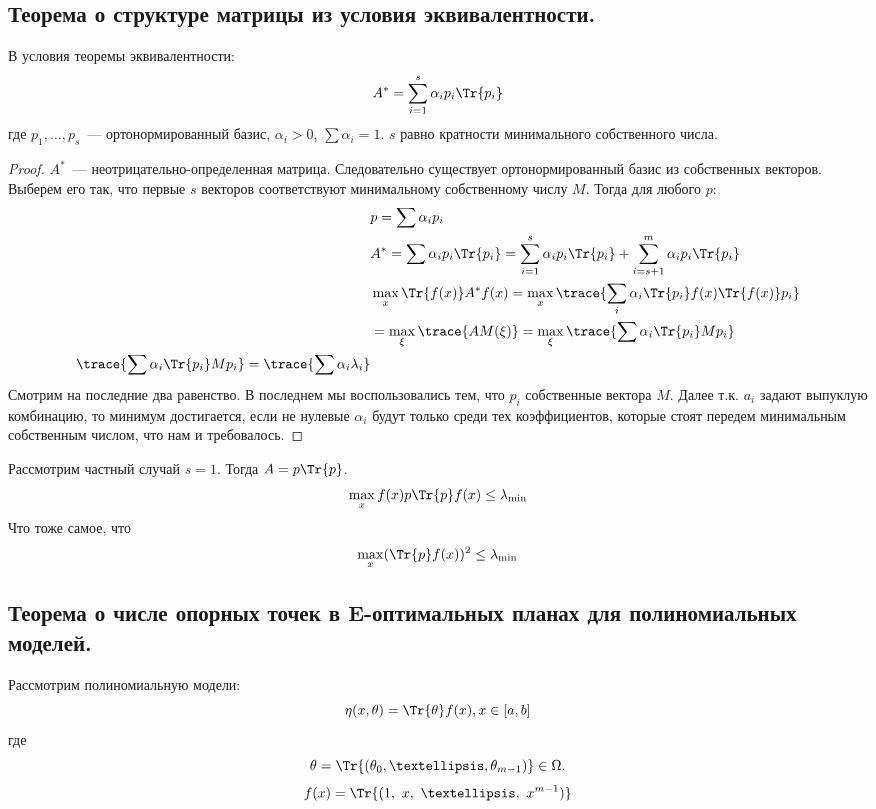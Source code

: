 \subsection{Теорема о структуре матрицы из условия эквивалентности.}
\begin{thm}
В условия теоремы эквивалентности:
$$ A^{*} = \sum \limits_{i=1}^s \alpha_i p_i \Tr{p_i}$$
где $p_1, …, p_s$ —  ортонормированный базис, $\alpha_i >0$, $\sum\alpha_i = 1$. 
$s$ равно кратности минимального собственного числа.
\end{thm}
\begin{proof}
$A^*$ — неотрицательно-определенная матрица. Следовательно существует ортонормированный базис из собственных векторов. Выберем его так, что первые $s$ векторов соответствуют минимальному собственному числу $M$. Тогда для любого $p$:
\begin{equation}
\begin{split}
&p = \sum \alpha_i p_i \\
&A^{*} = \sum \alpha_i p_i \Tr{p_i}  = \sum\limits_{i=1}^{s} \alpha_i p_i \Tr{p_i} + \sum\limits_{i=s+1}^m \alpha_i p_i \Tr{p_i}\\
&\max\limits_x\Tr{f(x)} A^{*} f(x) = \max\limits_{x}\trace{\sum\limits_i  \alpha_i \Tr{p_i} f(x)\Tr{f(x)} p_i} \\
& = \max\limits_{\xi}\trace{A M(\xi)} = \max \limits_{\xi}\trace{\sum \alpha_i \Tr{p_i}Mp_i} \\
\trace{\sum \alpha_i \Tr{p_i}Mp_i} = \trace{\sum \alpha_i \lambda_i}
\end{split}
\end{equation}
Смотрим на последние два равенство. В последнем мы воспользовались тем, что $p_i$ собственные вектора $M$. Далее т.к. $a_i$ задают выпуклую комбинацию, то минимум достигается, если не нулевые $\alpha_i$  будут только среди тех коэффициентов, которые стоят передем минимальным собственным числом, что нам и требовалось.
\end{proof}

\begin{note}
Рассмотрим частный случай $s=1$. Тогда $A = p \Tr{p}$. 
$$\max\limits_{x} f(x) p \Tr{p} f(x) \leq \lambda_{\min}$$
Что тоже самое, что 
$$\max\limits_{x} (\Tr{p}f(x))^2 \leq \lambda_{\min}$$
\end{note}

\subsection{Теорема о числе опорных точек в E-оптимальных планах для полиномиальных моделей.}
Рассмотрим полиномиальную модели:
\begin{equation}
\eta(x,\theta)  = \Tr{\theta}f(x), x \in [a,b]
\end{equation}
где
$$\theta = \Tr{(\theta_0, …, \theta_{m-1})}  \in \Omega.$$ 
$$f(x) = \Tr{(1, x, …, x^{m-1})}$$

